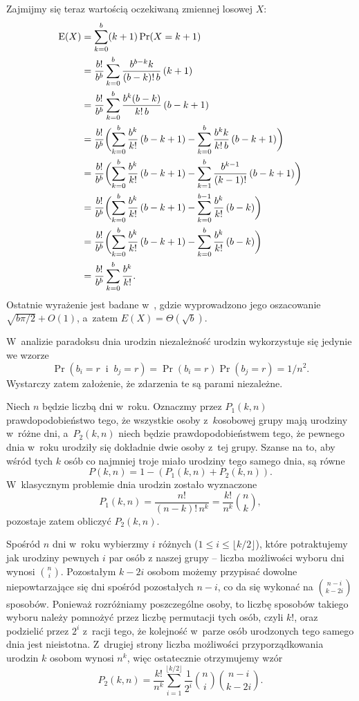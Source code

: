 Zajmijmy się teraz wartością oczekiwaną zmiennej losowej $X$:
\begin{align*}
	\operatorname{E}(X) &= \sum_{k=0}^b(k+1)\Pr(X=k+1) \\
	&= \frac{b!}{b^b}\sum_{k=0}^b\frac{b^{b-k}k}{(b-k)!\,b}\,(k+1) \\
	&= \frac{b!}{b^b}\sum_{k=0}^b\frac{b^k(b-k)}{k!\,b}\,(b-k+1) \\
	&= \frac{b!}{b^b}\biggl(\sum_{k=0}^b\frac{b^k}{k!}\,(b-k+1)-\sum_{k=0}^b\frac{b^kk}{k!\,b}\,(b-k+1)\biggr) \\
	&= \frac{b!}{b^b}\biggl(\sum_{k=0}^b\frac{b^k}{k!}\,(b-k+1)-\sum_{k=1}^b\frac{b^{k-1}}{(k-1)!}\,(b-k+1)\biggr) \\
	&= \frac{b!}{b^b}\biggl(\sum_{k=0}^b\frac{b^k}{k!}\,(b-k+1)-\sum_{k=0}^{b-1}\frac{b^k}{k!}\,(b-k)\biggr) \\
	&= \frac{b!}{b^b}\biggl(\sum_{k=0}^b\frac{b^k}{k!}\,(b-k+1)-\sum_{k=0}^b\frac{b^k}{k!}\,(b-k)\biggr) \\
	&= \frac{b!}{b^b}\sum_{k=0}^b\frac{b^k}{k!}.
\end{align*}
Ostatnie wyrażenie jest badane w~\cite{taocp1frag}, gdzie wyprowadzono jego oszacowanie $\sqrt{b\pi/2}+O(1)$, a~zatem $E(X)=\Theta(\!\sqrt{b})$.

\exercise %
W~analizie paradoksu dnia urodzin niezależność urodzin wykorzystuje się jedynie we wzorze
\[
    \Pr(b_i=r\;\;\text{i}\;\;b_j=r) = \Pr(b_i=r)\Pr(b_j=r) = 1/n^2.
\]
Wystarczy zatem założenie, że zdarzenia te są parami niezależne.

\exercise %
Niech $n$ będzie liczbą dni w~roku.
Oznaczmy przez $P_1(k,n)$ prawdopodobieństwo tego, że wszystkie osoby z~$k$\nbhyphen osobowej grupy mają urodziny w~różne dni, a~$P_2(k,n)$ niech będzie prawdopodobieństwem tego, że pewnego dnia w~roku urodziły się dokładnie dwie osoby z~tej grupy.
Szanse na to, aby wśród tych $k$ osób co najmniej troje miało urodziny tego samego dnia, są równe
\[
	P(k,n) = 1-(P_1(k,n)+P_2(k,n)).
\]
W~klasycznym problemie dnia urodzin zostało wyznaczone
\[
	P_1(k,n) = \frac{n!}{(n-k)!\,n^k} = \frac{k!}{n^k}\binom{n}{k},
\]
pozostaje zatem obliczyć $P_2(k,n)$.

Spośród $n$ dni w~roku wybierzmy $i$ różnych ($1\le i\le\lfloor k/2\rfloor$), które potraktujemy jak urodziny pewnych $i$ par osób z naszej grupy -- liczba możliwości wyboru dni wynosi $\binom{n}{i}$.
Pozostałym $k-2i$ osobom możemy przypisać dowolne niepowtarzające się dni spośród pozostałych $n-i$, co da się wykonać na $\binom{n-i}{k-2i}$ sposobów.
Ponieważ rozróżniamy poszczególne osoby, to liczbę sposobów takiego wyboru należy pomnożyć przez liczbę permutacji tych osób, czyli $k!$, oraz podzielić przez $2^i$ z~racji tego, że kolejność w~parze osób urodzonych tego samego dnia jest nieistotna.
Z~drugiej strony liczba możliwości przyporządkowania urodzin $k$ osobom wynosi $n^k$, więc ostatecznie otrzymujemy wzór
\[
	P_2(k,n) = \frac{k!}{n^k}\sum_{i=1}^{\lfloor k/2\rfloor}\frac{1}{2^i}\binom{n}{i}\binom{n-i}{k-2i}.
\]

